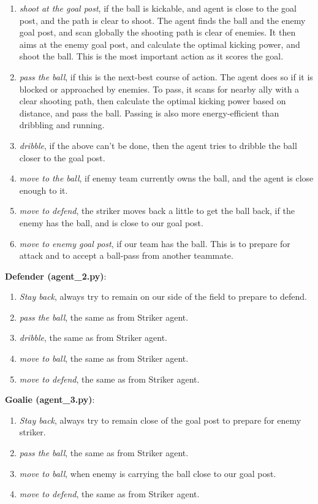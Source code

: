 \documentclass[12pt]{article}  %
\begin{document}
\begin{enumerate}
	\item \emph{shoot at the goal post}, if the ball is kickable, and agent is close to the goal post, and the path is clear to shoot. The agent finds the ball and the enemy goal post, and scan globally the shooting path is clear of enemies. It then aims at the enemy goal post, and calculate the optimal kicking power, and shoot the ball. This is the most important action as it scores the goal.
	\item \emph{pass the ball}, if this is the next-best course of action. The agent does so if it is blocked or approached by enemies. To pass, it scans for nearby ally with a clear shooting path, then calculate the optimal kicking power based on distance, and pass the ball. Passing is also more energy-efficient than dribbling and running.
	\item \emph{dribble}, if the above can't be done, then the agent tries to dribble the ball closer to the goal post.
	\item \emph{move to the ball}, if enemy team currently owns the ball, and the agent is close enough to it.
	\item \emph{move to defend}, the striker moves back a little to get the ball back, if the enemy has the ball, and is close to our goal post.
	\item \emph{move to enemy goal post}, if our team has the ball. This is to prepare for attack and to accept a ball-pass from another teammate.
\end{enumerate}


{\bf Defender (agent\_2.py)}:

\begin{enumerate}
	\item \emph{Stay back}, always try to remain on our side of the field to prepare to defend.
	\item \emph{pass the ball}, the same as from Striker agent.
	\item \emph{dribble}, the same as from Striker agent.
	\item \emph{move to ball}, the same as from Striker agent.
	\item \emph{move to defend}, the same as from Striker agent.
\end{enumerate}



{\bf Goalie (agent\_3.py)}:

\begin{enumerate}
	\item \emph{Stay back}, always try to remain close of the goal post to prepare for enemy striker.
	\item \emph{pass the ball}, the same as from Striker agent.
	\item \emph{move to ball}, when enemy is carrying the ball close to our goal post.
	\item \emph{move to defend}, the same as from Striker agent.
\end{enumerate}
\end{document}
